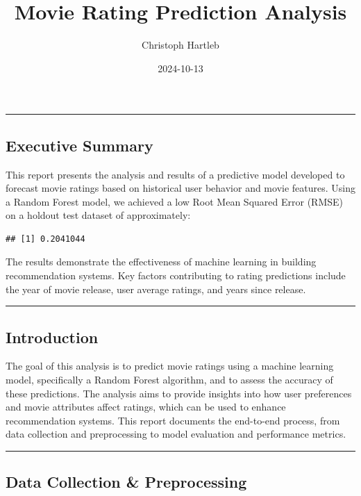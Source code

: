 \documentclass[
]{article}
\title{Movie Rating Prediction Analysis}
\author{Christoph Hartleb}
\date{2024-10-13}
\begin{document}
\maketitle

{
\setcounter{tocdepth}{3}
\tableofcontents
}
\begin{center}\rule{0.5\linewidth}{0.5pt}\end{center}

\subsection{Executive Summary}\label{executive-summary}

This report presents the analysis and results of a predictive model
developed to forecast movie ratings based on historical user behavior
and movie features. Using a Random Forest model, we achieved a low Root
Mean Squared Error (RMSE) on a holdout test dataset of approximately:

\begin{verbatim}
## [1] 0.2041044
\end{verbatim}

The results demonstrate the effectiveness of machine learning in
building recommendation systems. Key factors contributing to rating
predictions include the year of movie release, user average ratings, and
years since release.

\begin{center}\rule{0.5\linewidth}{0.5pt}\end{center}

\subsection{Introduction}\label{introduction}

The goal of this analysis is to predict movie ratings using a machine
learning model, specifically a Random Forest algorithm, and to assess
the accuracy of these predictions. The analysis aims to provide insights
into how user preferences and movie attributes affect ratings, which can
be used to enhance recommendation systems. This report documents the
end-to-end process, from data collection and preprocessing to model
evaluation and performance metrics.

\begin{center}\rule{0.5\linewidth}{0.5pt}\end{center}

\subsection{Data Collection \&
Preprocessing}\label{data-collection-preprocessing}
\end{document}
